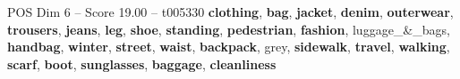 \begin{textsample}{POS Dim 6 – Score 19.00 – t005330}  \label{ex:f6_pos_006}
\textbf{clothing}, \textbf{bag}, \textbf{jacket}, \textbf{denim}, \textbf{outerwear}, \textbf{trousers}, \textbf{jeans}, \textbf{leg}, \textbf{shoe}, \textbf{standing}, \textbf{pedestrian}, \textbf{fashion}, luggage\_\&\_bags, \textbf{handbag}, \textbf{winter}, \textbf{street}, \textbf{waist}, \textbf{backpack}, grey, \textbf{sidewalk}, \textbf{travel}, \textbf{walking}, \textbf{scarf}, \textbf{boot}, \textbf{sunglasses}, \textbf{baggage}, \textbf{cleanliness}

\end{textsample}
